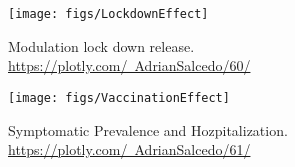 \begin{figure}[tbh]
    \centering
    \texttt{[image: figs/LockdownEffect]}
    \caption{Modulation lock down release.
    \href{https://plotly.com/~AdrianSalcedo/60/}
    {https://plotly.com/~AdrianSalcedo/60/}}
    \label{fig:lockdowneffect}
\end{figure}

\begin{figure*}[tbh]
    \centering
    \texttt{[image: figs/VaccinationEffect]}
    \caption{Symptomatic Prevalence and Hozpitalization.
        \href{https://plotly.com/~AdrianSalcedo/61/}
        {https://plotly.com/~AdrianSalcedo/61/}}
    \label{fig:vaccinationeffect}
\end{figure*}
